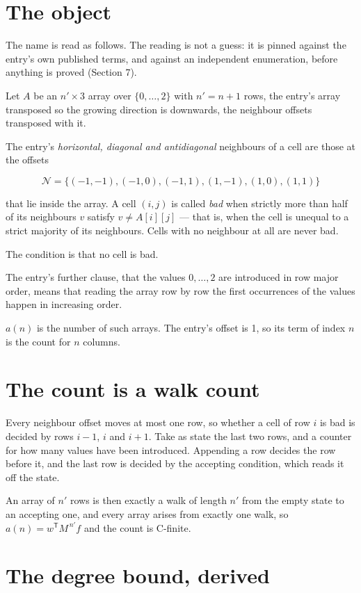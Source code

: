 \documentclass[11pt]{article}
\theoremstyle{definition}
\begin{document}
\section{The object}

The name is read as follows. The reading is not a guess: it is pinned against the entry's own published terms, and against an independent enumeration, before anything is proved (Section 7).

Let $A$ be an $n' \times 3$ array over $\{0,\dots,2\}$ with $n' = n + 1$ rows, the entry's array transposed so the growing direction is downwards, the neighbour offsets transposed with it.

The entry's {\itshape horizontal, diagonal and antidiagonal} neighbours of a cell are those at the offsets

\[\mathcal{N} = \{(-1,-1), (-1,0), (-1,1), (1,-1), (1,0), (1,1)\}\]

that lie inside the array. A cell $(i,j)$ is called {\itshape bad} when strictly more than half of its neighbours $v$ satisfy $v \ne A[i][j]$ --- that is, when the cell is unequal to a strict majority of its neighbours. Cells with no neighbour at all are never bad.

The condition is that no cell is bad.

The entry's further clause, that the values $0,\dots,2$ are introduced in row major order, means that reading the array row by row the first occurrences of the values happen in increasing order.

$a(n)$ is the number of such arrays. The entry's offset is 1, so its term of index $n$ is the count for $n$ columns.

\section{The count is a walk count}

Every neighbour offset moves at most one row, so whether a cell of row $i$ is bad is decided by rows $i-1$, $i$ and $i+1$. Take as state the last two rows, and a counter for how many values have been introduced. Appending a row decides the row before it, and the last row is decided by the accepting condition, which reads it off the state.

An array of $n'$ rows is then exactly a walk of length $n'$ from the empty state to an accepting one, and every array arises from exactly one walk, so $a(n) = w^{\mathsf T}M^{\,n'}f$ and the count is C-finite.

\section{The degree bound, derived}
\end{document}
